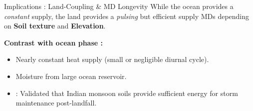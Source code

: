 \documentclass[8pt, aspectratio=169]{beamer}
\begin{document}
\begin{frame}{Implications : Land-Coupling \& MD Longevity}
    \footnotesize
    While the ocean provides a \textit{constant} supply, the land provides a \textit{pulsing} but efficient supply MDs depending on \textbf{Soil texture} and \textbf{Elevation}.

    \footnotesize
    \textbf{Contrast with ocean phase :}
    \begin{itemize}
        \tiny
        \item Nearly constant heat supply (small or negligible diurnal cycle).
        \item Moisture from large ocean reservoir.
    \end{itemize}

    \vfill
    \noindent\makebox[\linewidth]{\rule{\paperwidth}{0.4pt}}
    \vspace{-0.2cm}
    \tiny
    \begin{itemize}
        \item \cite{kishtawal2013tropical} : Validated that Indian monsoon soils provide sufficient energy for storm maintenance post-landfall.
    \end{itemize}
\end{frame}
\end{document}
